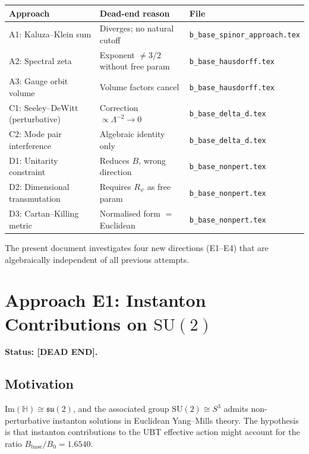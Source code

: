 \documentclass[11pt,a4paper]{article}
\theoremstyle{definition}
\theoremstyle{remark}
\begin{document}
\begin{center}
\begin{tabular}{lll}
  \toprule
  Approach & Dead-end reason & File \\
  \midrule
  A1: Kaluza--Klein sum & Diverges; no natural cutoff
    & \texttt{b\_base\_spinor\_approach.tex} \\
  A2: Spectral zeta & Exponent $\ne 3/2$ without free param
    & \texttt{b\_base\_hausdorff.tex} \\
  A3: Gauge orbit volume & Volume factors cancel
    & \texttt{b\_base\_hausdorff.tex} \\
  C1: Seeley--DeWitt (perturbative) & Correction $\propto \Lambda^{-2} \to 0$
    & \texttt{b\_base\_delta\_d.tex} \\
  C2: Mode pair interference & Algebraic identity only
    & \texttt{b\_base\_delta\_d.tex} \\
  D1: Unitarity constraint & Reduces $B$, wrong direction
    & \texttt{b\_base\_nonpert.tex} \\
  D2: Dimensional transmutation & Requires $R_\psi$ as free param
    & \texttt{b\_base\_nonpert.tex} \\
  D3: Cartan--Killing metric & Normalised form $=$ Euclidean
    & \texttt{b\_base\_nonpert.tex} \\
  \bottomrule
\end{tabular}
\end{center}

The present document investigates four new directions (E1--E4) that are
algebraically independent of all previous attempts.

\section{Approach E1: Instanton Contributions on $\mathrm{SU}(2)$}
\label{sec:E1_instantons}

\textbf{Status: [DEAD END].}

\subsection{Motivation}

$\mathrm{Im}(\mathbb{H}) \cong \mathfrak{su}(2)$, and the associated group
$\mathrm{SU}(2) \cong S^3$ admits non-perturbative instanton solutions in
Euclidean Yang--Mills theory.
The hypothesis is that instanton contributions to the UBT effective action
might account for the ratio $B_{\mathrm{base}}/B_0 = 1.6540$.
\end{document}
